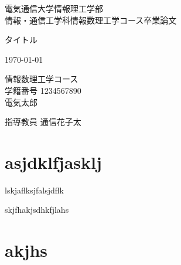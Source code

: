 \documentclass[12pt]{jarticle}
\begin{document}
\thispagestyle{empty}
\vfill
\hfill 電気通信大学情報理工学部 \\
\hfill 情報・通信工学科情報数理工学コース卒業論文
%
%
\vfill
\begin{center}
  \Large タイトル
\end{center}
\vfill
\begin{center}
  \today
\end{center}
\vfill
\begin{center}
  \large
  情報数理工学コース\\[1cm]
  学籍番号 1234567890\\[1cm]
  電気太郎
\end{center}
\begin{center}
  指導教員 通信花子太
\end{center}
\vfill

\pagebreak
\section{asjdklfjasklj}
lskjaflksjfalsjdflk

skjfhakjsdhkfjlahs

\newpage 
\section{akjhs}
\end{document}
